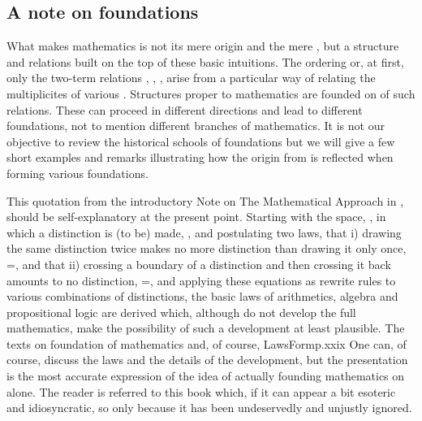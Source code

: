 \subsection{A note on foundations}\label{sub:foundations} 
What makes mathematics is not its mere origin and the mere ,
but a structure and relations built on the top of these basic intuitions.
The ordering or, at first, only the two-term relations ,
, , arise from a particular way of relating the
multiplicites of various .  Structures proper to mathematics are
founded on  of such relations.  These
 can proceed in different directions and lead to different
foundations, not to mention different branches of mathematics.  It is not our
objective to review the historical schools of foundations but we will give a few
short examples and remarks illustrating how the origin from  
is reflected when forming various foundations.

\pa {} This quotation from the
introductory Note on The Mathematical Approach in \citeauthor*{LawsForm}, should
be self-explanatory at the present point. Starting with the space, \esp, in
which a distinction is (to be) made, \setlength{\unitlength}{.1cm}\dist, and postulating two laws, that i)
drawing the same distinction twice makes no more distinction than drawing it
only once, \dist\dist=\dist, and that ii) crossing a boundary of a distinction
and then crossing it back amounts to no distinction, \twice=\esp, and applying
these equations as rewrite rules to various combinations of distinctions, the
basic laws of arithmetics, algebra and propositional logic are derived which,
although do not develop the full mathematics, make the possibility of such a
development at least plausible. The texts on foundation of mathematics and, of
course, \citet{mathematical texts generally begin the story somewhere in the
  middle, leaving the reader to pick up the thread as best he can. Here the
  story is traced from the beginning.}{LawsForm}{p.xxix} One can, of course,
discuss the laws and the details of the development, but the presentation is the
most accurate expression of the idea of actually founding mathematics on
 alone. The reader is referred to this book which, if it
can appear a bit esoteric and idiosyncratic, so only because it has been
undeservedly and unjustly ignored.

